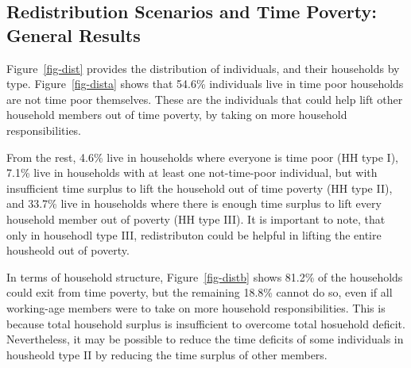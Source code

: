 \documentclass[
  11pt,
]{article}
\begin{document}
\subsection{Redistribution Scenarios and Time Poverty: General
Results}\label{redistribution-scenarios-and-time-poverty-general-results}

Figure~\ref{fig-dist} provides the distribution of individuals, and
their households by type. Figure~\ref{fig-dista} shows that 54.6\%
individuals live in time poor households are not time poor themselves.
These are the individuals that could help lift other household members
out of time poverty, by taking on more household responsibilities.

From the rest, 4.6\% live in households where everyone is time poor (HH
type I), 7.1\% live in households with at least one not-time-poor
individual, but with insufficient time surplus to lift the household out
of time poverty (HH type II), and 33.7\% live in households where there
is enough time surplus to lift every household member out of poverty (HH
type III). It is important to note, that only in househodl type III,
redistributon could be helpful in lifting the entire housheold out of
poverty.

In terms of household structure, Figure~\ref{fig-distb} shows 81.2\% of
the households could exit from time poverty, but the remaining 18.8\%
cannot do so, even if all working-age members were to take on more
household responsibilities. This is because total household surplus is
insufficient to overcome total hosuehold deficit. Nevertheless, it may
be possible to reduce the time deficits of some individuals in housheold
type II by reducing the time surplus of other members.
\end{document}
